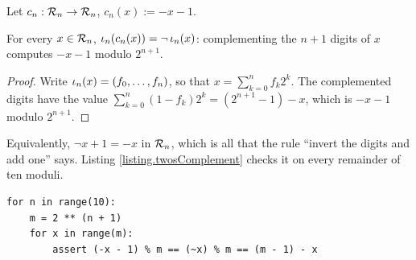 Let $c_n : \mathcal{R}_{n} \to \mathcal{R}_{n}$, $c_n(x) := -x - 1$.

\begin{prop}\label{prop.twosComplement}
 For every $x \in \mathcal{R}_{n}$,
 $\iota_{n}(c_n(x)) = \neg\, \iota_{n}(x)$:
 complementing the $n+1$ digits of $x$ computes $-x-1$ modulo $2^{n+1}$.
\end{prop}
\begin{proof}
 Write $\iota_{n}(x) = (f_0, \dots, f_n)$, so that $x = \sum_{k=0}^{n} f_k 2^k$.
 The complemented digits have the value
 $\sum_{k=0}^{n} (1 - f_k) 2^k = (2^{n+1} - 1) - x$,
 which is $-x - 1$ modulo $2^{n+1}$.
\end{proof}

Equivalently, $\neg x + 1 = -x$ in $\mathcal{R}_{n}$,
which is all that the rule ``invert the digits and add one'' says.
Listing \ref{listing.twosComplement} checks it on every remainder of ten moduli.

\begin{lstlisting}[caption={Complementing the digits computes $-x-1$.}, label=listing.twosComplement]
for n in range(10):
    m = 2 ** (n + 1)
    for x in range(m):
        assert (-x - 1) % m == (~x) % m == (m - 1) - x
\end{lstlisting}
